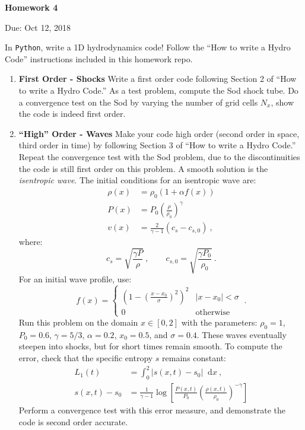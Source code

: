 \documentclass{article}
\newcommand{\Python}{{\texttt{Python}}}
\newcommand*\diff{\mathop{}\!\mathrm{d}}
\begin{document}
\begin{center}

\vspace*{-2.5cm}
\LARGE
\bf{Homework 4}
\vspace{1cm}

\large{Due: Oct 12, 2018}
\vspace{1cm}

\end{center}

In \Python{}, write a 1D hydrodynamics code!  Follow the ``How to write a Hydro Code'' instructions included in this homework repo.

\begin{enumerate}
	\item {\bf First Order - Shocks} 
		Write a first order code following Section 2 of ``How to write a Hydro Code.'' As a test problem, compute the Sod shock tube.  Do a convergence test on the Sod by varying the number of grid cells $N_x$, show the code is indeed first order.
	\item {\bf ``High'' Order - Waves} 
		Make your code high order (second order in space, third order in time) by following Section 3 of  ``How to write a Hydro Code.''  Repeat the convergence test with the Sod problem, due to the discontinuities the code is still first order on this problem.  A smooth solution is the \emph{isentropic wave}.  The initial conditions for an isentropic wave are:
		\begin{align}
			\rho(x) &= \rho_0 \left( 1 + \alpha f(x) \right) \\
			P(x) &= P_0 \left(\frac{\rho}{\rho_0}\right)^\gamma \\
			v(x) &= \frac{2}{\gamma-1} \left( c_s - c_{s,0} \right) \ ,
		\end{align}
		where:
		\begin{equation}
			c_s = \sqrt{\frac{\gamma P}{\rho}} \ , \qquad c_{s,0} = \sqrt{\frac{\gamma P_0}{\rho_0}} \ .
		\end{equation}
		For an initial wave profile, use:
		\begin{equation}
			f(x) = \left \{ \begin{matrix} 
						\left(1-\left(\frac{x-x_0}{\sigma}\right)^2\right)^2 & |x-x_0| < \sigma \\
						0 & \text{otherwise}
					\end{matrix} \right . \ .
		\end{equation}
		Run this problem on the domain $x \in [0,2]$ with the parameters: $\rho_0 = 1$, $P_0=0.6$, $\gamma=5/3$, $\alpha=0.2$, $x_0=0.5$, and $\sigma=0.4$.  
		These waves eventually steepen into shocks, but for short times remain smooth.  To compute the error, check that the specific entropy $s$ remains constant:
		\begin{align}
			L_1(t) & = \int_0^2 |s(x,t) - s_0| \diff x \ , \\
			s(x,t)-s_0 &= \frac{1}{\gamma-1} \log \left[\frac{P(x,t)}{P_0} \left(\frac{\rho(x,t)}{\rho_0}\right)^{-\gamma}\right]
		\end{align}
		Perform a convergence test with this error measure, and demonstrate the code is second order accurate.
\end{enumerate}
\end{document}
